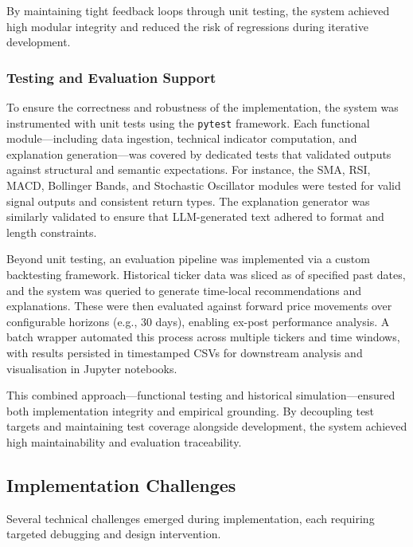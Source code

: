 By maintaining tight feedback loops through unit testing, the system achieved high modular integrity and reduced the risk of regressions during iterative development.

\subsubsection{Testing and Evaluation Support}

To ensure the correctness and robustness of the implementation, the system was instrumented with unit tests using the \texttt{pytest} framework. Each functional module—including data ingestion, technical indicator computation, and explanation generation—was covered by dedicated tests that validated outputs against structural and semantic expectations. For instance, the SMA, RSI, MACD, Bollinger Bands, and Stochastic Oscillator modules were tested for valid signal outputs and consistent return types. The explanation generator was similarly validated to ensure that LLM-generated text adhered to format and length constraints.

Beyond unit testing, an evaluation pipeline was implemented via a custom backtesting framework. Historical ticker data was sliced as of specified past dates, and the system was queried to generate time-local recommendations and explanations. These were then evaluated against forward price movements over configurable horizons (e.g., 30 days), enabling ex-post performance analysis. A batch wrapper automated this process across multiple tickers and time windows, with results persisted in timestamped CSVs for downstream analysis and visualisation in Jupyter notebooks.

This combined approach—functional testing and historical simulation—ensured both implementation integrity and empirical grounding. By decoupling test targets and maintaining test coverage alongside development, the system achieved high maintainability and evaluation traceability.

\subsection{Implementation Challenges}

Several technical challenges emerged during implementation, each requiring targeted debugging and design intervention.

